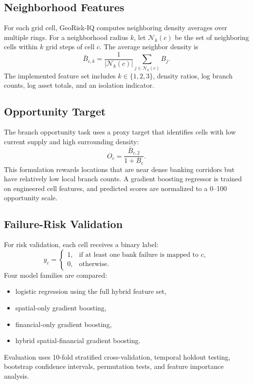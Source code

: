 \documentclass[conference]{IEEEtran}
\begin{document}
\subsection{Neighborhood Features}
For each grid cell, GeoRisk-IQ computes neighboring density averages over
multiple rings. For a neighborhood radius $k$, let $\mathcal{N}_k(c)$ be the
set of neighboring cells within $k$ grid steps of cell $c$. The average
neighbor density is
\begin{equation}
    \bar{B}_{c,k} =
    \frac{1}{|\mathcal{N}_k(c)|}
    \sum_{j \in \mathcal{N}_k(c)} B_j.
\end{equation}
The implemented feature set includes $k \in \{1,2,3\}$, density ratios, log
branch counts, log asset totals, and an isolation indicator.

\subsection{Opportunity Target}
The branch opportunity task uses a proxy target that identifies cells with
low current supply and high surrounding density:
\begin{equation}
    O_c = \frac{\bar{B}_{c,2}}{1 + B_c}.
\end{equation}
This formulation rewards locations that are near dense banking corridors but
have relatively low local branch counts. A gradient boosting regressor is
trained on engineered cell features, and predicted scores are normalized to
a 0--100 opportunity scale.

\subsection{Failure-Risk Validation}
For risk validation, each cell receives a binary label:
\begin{equation}
    y_c =
    \begin{cases}
    1, & \text{if at least one bank failure is mapped to } c,\\
    0, & \text{otherwise.}
    \end{cases}
\end{equation}
Four model families are compared:
\begin{itemize}
    \item logistic regression using the full hybrid feature set,
    \item spatial-only gradient boosting,
    \item financial-only gradient boosting,
    \item hybrid spatial-financial gradient boosting.
\end{itemize}
Evaluation uses 10-fold stratified cross-validation, temporal holdout
testing, bootstrap confidence intervals, permutation tests, and feature
importance analysis.
\end{document}
